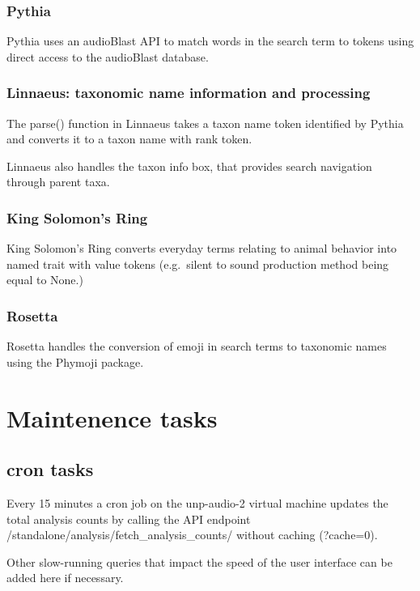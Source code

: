 \documentclass[
]{book}
\begin{document}
\hypertarget{pythia}{%
\subsection{Pythia}\label{pythia}}

Pythia uses an audioBlast API to match words in the search term to tokens using direct access to the audioBlast database.

\hypertarget{linnaeus-taxonomic-name-information-and-processing}{%
\subsection{Linnaeus: taxonomic name information and processing}\label{linnaeus-taxonomic-name-information-and-processing}}

The parse() function in Linnaeus takes a taxon name token identified by Pythia and converts it to a taxon name with rank token.

Linnaeus also handles the taxon info box, that provides search navigation through parent taxa.

\hypertarget{king-solomons-ring}{%
\subsection{King Solomon's Ring}\label{king-solomons-ring}}

King Solomon's Ring converts everyday terms relating to animal behavior into named trait with value tokens (e.g.~silent to sound production method being equal to None.)

\hypertarget{rosetta}{%
\subsection{Rosetta}\label{rosetta}}

Rosetta handles the conversion of emoji in search terms to taxonomic names using the Phymoji package.

\hypertarget{maintenence-tasks}{%
\chapter{Maintenence tasks}\label{maintenence-tasks}}

\hypertarget{cron-tasks}{%
\section{cron tasks}\label{cron-tasks}}

Every 15 minutes a cron job on the unp-audio-2 virtual machine updates the total analysis counts by calling the API endpoint /standalone/analysis/fetch\_analysis\_counts/ without caching (?cache=0).

Other slow-running queries that impact the speed of the user interface can be added here if necessary.

  
\end{document}
